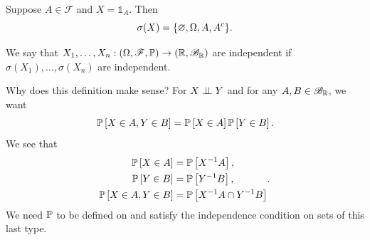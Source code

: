 \begin{example}
	Suppose $A \in \mathscr{F}$ and $X = \mathds{1}_{A}$. Then \[
		\sigma(X) = \{\O, \Omega, A, A^{c}\}
	.\] 
\end{example}

\begin{definition}
	We say that $X_1,\ldots,X_n: (\Omega, \mathscr{F}, \P) \to \left( \R,\mathscr{B}_\R \right)$ are independent if $\sigma\left( X_1 \right),\ldots,\sigma(X_n)$ are independent.
\end{definition}

Why does this definition make sense? 
For $X \ind Y$ and for any $A,B \in \mathscr{B}_\R$, we want \[
	\P\left[X \in A, Y \in B\right] = \P\left[X \in A\right]  \P\left[Y \in B\right] 
.\] We see that \[
	\begin{aligned}
		\P\left[X \in A\right]  &= \P\left[X ^{-1}A\right], \\
		\P\left[Y \in B\right] &= \P\left[Y ^{-1} B\right], \\
		\P\left[X \in A, Y \in B\right]  &= \P\left[X ^{-1}A \cap Y ^{-1}B\right]
	\end{aligned}
.\] We need $\P$ to be defined on and satisfy the independence condition on sets of this last type.

